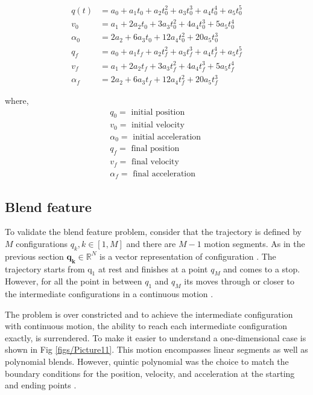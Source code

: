 \documentclass{UoNMCHA}
\numberwithin{equation}{section}
\begin{document}
	
	\begin{align}
	q(t)&=a_{0}+a_{1} t_{0}+a_{2} t_{0}^{2}+a_{3} t_{0}^{3}+a_{4} t_{0}^{4}+a_{5} t_{0}^{5} \\
	v_{0}&=a_{1}+2 a_{2} t_{0}+3 a_{3} t_{0}^{2}+4 a_{4} t_{0}^{3}+5 a_{5} t_{0}^{4} \\
	\alpha_{0}&=2 a_{2}+6 a_{3} t_{0}+12 a_{4} t_{0}^{2}+20 a_{5} t_{0}^{3} \\
	q_{f}&=a_{0}+a_{1} t_{f}+a_{2} t_{f}^{2}+a_{3} t_{f}^{3}+a_{4} t_{f}^{4}+a_{5} t_{f}^{5} \\
	v_{f}&=a_{1}+2 a_{2} t_{f}+3 a_{3} t_{f}^{2}+4 a_{4} t_{f}^{3}+5 a_{5} t_{f}^{4} \\
	\alpha_{f}&=2 a_{2}+6 a_{3} t_{f}+12 a_{4} t_{f}^{2}+20 a_{5} t_{f}^{3}
	\end{align}

	where,
	$$
	\begin{array}{l}
			q_{0}=\text { initial position } \\
		v_{0}=\text { initial velocity } \\
		\alpha_{0}=\text { initial acceleration }\\
	q_{f}=\text { final position } \\
	v_{f}=\text { final velocity } \\
	\alpha_{f}=\text { final acceleration }
	\end{array}
	$$
	\subsection{Blend feature} 
	
To validate the blend feature problem, consider that the trajectory is defined by $M$ configurations
$q_{k}, k \in[1, M]$ and there are $M-1$ motion segments. As in the previous section $\boldsymbol{q}_{\boldsymbol{k}} \in \mathbb{R}^{N}$ is a vector
representation of configuration \cite{corke_2017_robotics}. The trajectory starts from $\mathrm{q}_{1}$ at rest and finishes at a
point $q_{M}$ and comes to a stop. However, for all the point in between $q_{1}$ and $q_{M}$ its moves through or
closer to the intermediate configurations in a continuous motion \cite{corke_2017_robotics}.
	
The problem is over constricted and to achieve the intermediate configuration with continuous motion,
the ability to reach each intermediate configuration exactly, is surrendered. To make it easier to
understand a one-dimensional case is shown in Fig \ref{figs/Picture11}. This motion encompasses linear segments as
well as polynomial blends. However, quintic polynomial was the choice to match the boundary
conditions for the position, velocity, and acceleration at the starting and ending points \cite{corke_2017_robotics}.
	
\end{document}

